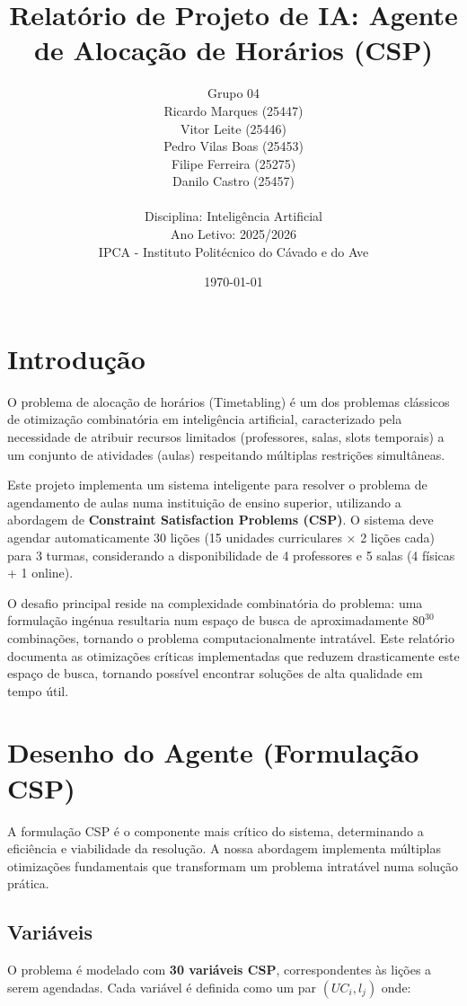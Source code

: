 \documentclass[a4paper, 12pt]{article}
\title{Relatório de Projeto de IA: Agente de Alocação de Horários (CSP)}
\author{
    Grupo 04 \\
    Ricardo Marques (25447) \\
    Vitor Leite (25446) \\
    Pedro Vilas Boas (25453) \\
    Filipe Ferreira (25275) \\
    Danilo Castro (25457) \\
    \\
    Disciplina: Inteligência Artificial \\
    Ano Letivo: 2025/2026 \\
    IPCA - Instituto Politécnico do Cávado e do Ave
}
\date{\today}
\begin{document}
\maketitle

\section{Introdução}

O problema de alocação de horários (Timetabling) é um dos problemas clássicos de otimização combinatória em inteligência artificial, caracterizado pela necessidade de atribuir recursos limitados (professores, salas, slots temporais) a um conjunto de atividades (aulas) respeitando múltiplas restrições simultâneas.

Este projeto implementa um sistema inteligente para resolver o problema de agendamento de aulas numa instituição de ensino superior, utilizando a abordagem de \textbf{Constraint Satisfaction Problems (CSP)}. O sistema deve agendar automaticamente 30 lições (15 unidades curriculares × 2 lições cada) para 3 turmas, considerando a disponibilidade de 4 professores e 5 salas (4 físicas + 1 online).

O desafio principal reside na complexidade combinatória do problema: uma formulação ingénua resultaria num espaço de busca de aproximadamente $80^{30}$ combinações, tornando o problema computacionalmente intratável. Este relatório documenta as otimizações críticas implementadas que reduzem drasticamente este espaço de busca, tornando possível encontrar soluções de alta qualidade em tempo útil.

\section{Desenho do Agente (Formulação CSP)}

A formulação CSP é o componente mais crítico do sistema, determinando a eficiência e viabilidade da resolução. A nossa abordagem implementa múltiplas otimizações fundamentais que transformam um problema intratável numa solução prática.

\subsection{Variáveis}

O problema é modelado com \textbf{30 variáveis CSP}, correspondentes às lições a serem agendadas. Cada variável é definida como um par $(UC_i, l_j)$ onde:
\end{document}
